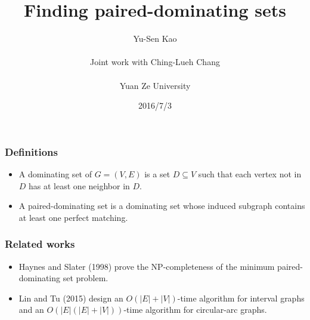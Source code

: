 \documentclass{beamer}
\begin{document}
\title{Finding paired-dominating sets}
\author{Yu-Sen Kao\\
\ \\
Joint work with Ching-Lueh Chang \\
\ \\
Yuan Ze University }


\date{2016/7/3}

\setcounter{footnote}{0}
\begin{frame}
\titlepage
\end{frame}




\setcounter{footnote}{0}
\begin{frame}\frametitle{Definitions}
\begin{itemize}
\item  A dominating set of $G=(V, E)$ is a set $D \subseteq V$ such that each vertex not in $D$ has at least one neighbor in $D$. 
\item  A paired-dominating set is a dominating set whose induced subgraph contains at least one perfect matching. 
\end{itemize}
\end{frame}

\setcounter{footnote}{0}
\begin{frame}\frametitle{Related works}
\begin{itemize}
\item  Haynes and Slater (1998) prove the NP-completeness of the minimum paired-dominating set problem. 
\item  Lin and Tu (2015) design an $O(|E|+|V|)$-time algorithm for interval graphs and an $O(|E|(|E|+|V|))$-time algorithm for circular-arc graphs. 
\end{itemize}
\end{frame}
\end{document}
